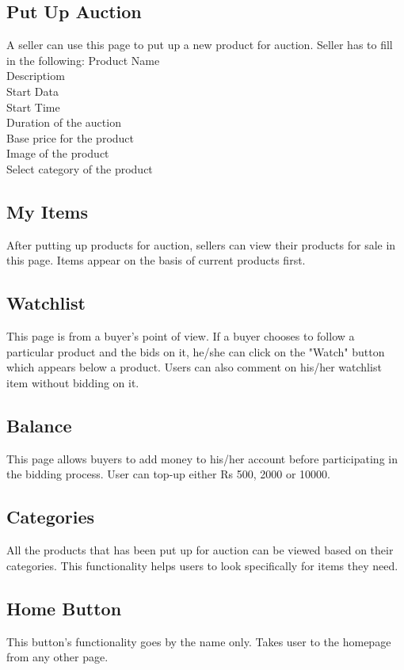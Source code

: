 \documentclass[12pt]{article}
\begin{document}
\subsection{Put Up Auction}
A seller can use this page to put up a new product for auction. Seller has to fill in the following:
Product Name\\
Descriptiom\\
Start Data\\
Start Time\\
Duration of the auction\\
Base price for the product\\
Image of the product\\
Select category of the product\\

\subsection{My Items}
After putting up products for auction, sellers can view their products for sale in this page. Items appear on the basis of current products first.

\subsection{Watchlist}
This page is from a buyer's point of view. If a buyer chooses to follow a particular product and the bids on it, he/she can click on the "Watch" button which appears below a product. Users can also comment on his/her watchlist item without bidding on it.

\subsection{Balance}
This page allows buyers to add money to his/her account before participating in the bidding process. User can top-up either Rs 500, 2000 or 10000.

\subsection{Categories}
All the products that has been put up for auction can be viewed based on their categories. This functionality helps users to look specifically for items they need.

\subsection{Home Button}
This button's functionality goes by the name only. Takes user to the homepage from any other page.
\end{document}
